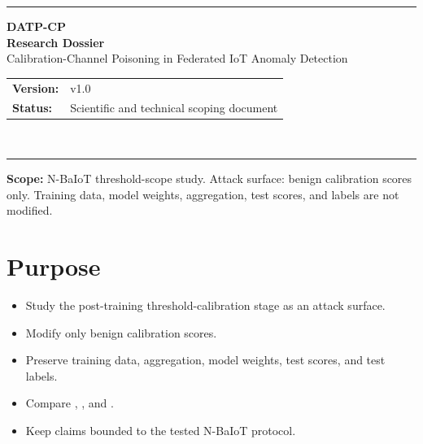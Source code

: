 
{\color{navyhead}\rule{\linewidth}{2pt}}

\begin{center}
  \vspace*{0.25em}
  {\Huge\bfseries\color{navyhead} DATP-CP}\\[0.4em]
  {\Large\bfseries\color{navyhead} Research Dossier}\\[0.6em]
  {\large Calibration-Channel Poisoning in Federated IoT Anomaly Detection}\\[0.75em]
  \small
  \begin{tabular}{@{}ll@{}}
    \textbf{Version:} & v1.0\\[2pt]
    \textbf{Status:}  & Scientific and technical scoping document
  \end{tabular}\\[0.55em]
\end{center}
{\color{navyhead}\rule{\linewidth}{1.2pt}}

\vspace{0.4em}

\begin{tcolorbox}[ambercallout]
\small\textbf{Scope:} N-BaIoT threshold-scope study.
Attack surface: benign calibration scores only.
Training data, model weights, aggregation, test scores, and labels are not modified.
\end{tcolorbox}

\vspace{0.25em}

\section{Purpose}

\begin{itemize}
  \item Study the post-training threshold-calibration stage as an attack surface.
  \item Modify only benign calibration scores.
  \item Preserve training data, aggregation, model weights, test scores, and test labels.
  \item Compare , , and
    .
  \item Keep claims bounded to the tested N-BaIoT protocol.
\end{itemize}


